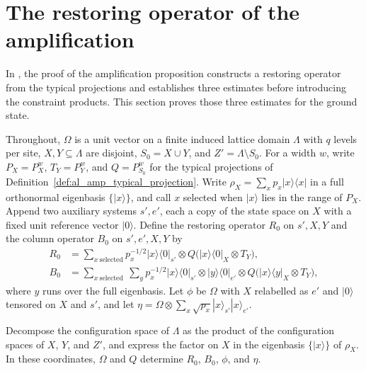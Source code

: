 
\section{The restoring operator of the amplification}

In \cite[Section~10]{OpenAI2026AreaLaw}, the proof of the amplification
proposition constructs a restoring operator from the typical projections and
establishes three estimates before introducing the constraint products. This
section proves those three estimates for the ground state.

Throughout, $\Omega$ is a unit vector on a finite induced lattice domain
$\Lambda$ with $q$ levels per site, $X,Y\subseteq\Lambda$ are disjoint,
$S_0=X\cup Y$, and $Z'=\Lambda\setminus S_0$. For a width $w$, write
$P_X=P_X^w$, $T_Y=P_Y^w$, and $Q=P_{S_0}^w$ for the typical projections of
Definition~\ref{def:al_amp_typical_projection}. Write
$\rho_X=\sum_xp_x|x\rangle\langle x|$ in a full orthonormal eigenbasis
$\{|x\rangle\}$, and call $x$ selected when $|x\rangle$ lies in the range
of $P_X$. Append two auxiliary systems $s',e'$, each a copy of the state space
on $X$ with a fixed unit reference vector $|0\rangle$. Define the restoring
operator $R_0$ on $s',X,Y$ and the column operator $B_0$ on $s',e',X,Y$ by
\begin{align*}
    R_0 & =\sum_{x\ \mathrm{selected}}p_x^{-1/2}
    |x\rangle\langle0|_{s'}\otimes
    Q\bigl(|x\rangle\langle0|_X\otimes T_Y\bigr),          \\
    B_0 & =\sum_{x\ \mathrm{selected}}\ \sum_{y}p_x^{-1/2}
    |x\rangle\langle0|_{s'}\otimes|y\rangle\langle0|_{e'}\otimes
    Q\bigl(|x\rangle\langle y|_X\otimes T_Y\bigr),
\end{align*}
where $y$ runs over the full eigenbasis. Let $\phi$ be $\Omega$ with $X$
relabelled as $e'$ and $|0\rangle$ tensored on $X$ and $s'$, and let
$\eta=\Omega\otimes\sum_x\sqrt{p_x}|x\rangle_{s'}|x\rangle_{e'}$.

\begin{definition}
    \label{def:al_amp_restoring_coordinates}
    \leanok
    Decompose the configuration space of $\Lambda$ as the product of the
    configuration spaces of $X$, $Y$, and $Z'$, and express the factor on $X$
    in the eigenbasis $\{|x\rangle\}$ of $\rho_X$. In these coordinates,
    $\Omega$ and $Q$ determine $R_0$, $B_0$, $\phi$, and $\eta$.
\end{definition}

